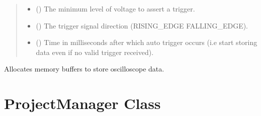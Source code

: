 \documentclass[letterpaper,10pt,english]{sphinxmanual}
\begin{document}
\begin{fulllineitems}
\begin{fulllineitems}
\begin{quote}
\begin{description}
\begin{itemize}
\item {} 
 () \textendash{} The minimum level of voltage to assert a trigger.

\item {} 
 () \textendash{} The trigger signal direction (RISING\_EDGE\textbar{} FALLING\_EDGE).

\item {} 
 () \textendash{} Time in milliseconds after which auto trigger occurs (i.e start storing data even if no valid trigger received).

\end{itemize}

\end{description}\end{quote}

\end{fulllineitems}


\begin{fulllineitems}
\label{\detokenize{reference_doc:Picoscope.setDataBuffers}}
Allocates memory buffers to store oscilloscope data.

\end{fulllineitems}


\end{fulllineitems}



\section{ProjectManager Class}
\label{\detokenize{reference_doc:projectmanager-class}}
\end{document}

